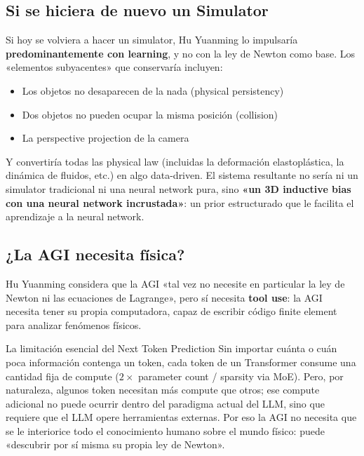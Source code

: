 \subsection{Si se hiciera de nuevo un Simulator}

Si hoy se volviera a hacer un simulator, Hu Yuanming lo impulsaría \textbf{predominantemente con learning}, y no con la ley de Newton como base. Los «elementos subyacentes» que conservaría incluyen:
\begin{itemize}
\item Los objetos no desaparecen de la nada (physical persistency)
\item Dos objetos no pueden ocupar la misma posición (collision)
\item La perspective projection de la camera
\end{itemize}

Y convertiría todas las physical law (incluidas la deformación elastoplástica, la dinámica de fluidos, etc.) en algo data-driven. El sistema resultante no sería ni un simulator tradicional ni una neural network pura, sino \textbf{«un 3D inductive bias con una neural network incrustada»}: un prior estructurado que le facilita el aprendizaje a la neural network.

\subsection{¿La AGI necesita física?}

Hu Yuanming considera que la AGI «tal vez no necesite en particular la ley de Newton ni las ecuaciones de Lagrange», pero sí necesita \textbf{tool use}: la AGI necesita tener su propia computadora, capaz de escribir código finite element para analizar fenómenos físicos.

\begin{knowledgebox}{La limitación esencial del Next Token Prediction}
Sin importar cuánta o cuán poca información contenga un token, cada token de un Transformer consume una cantidad fija de compute ($2 \times$ parameter count / sparsity via MoE). Pero, por naturaleza, algunos token necesitan más compute que otros; ese compute adicional no puede ocurrir dentro del paradigma actual del LLM, sino que requiere que el LLM opere herramientas externas. Por eso la AGI no necesita que se le interiorice todo el conocimiento humano sobre el mundo físico: puede «descubrir por sí misma su propia ley de Newton».
\end{knowledgebox}


